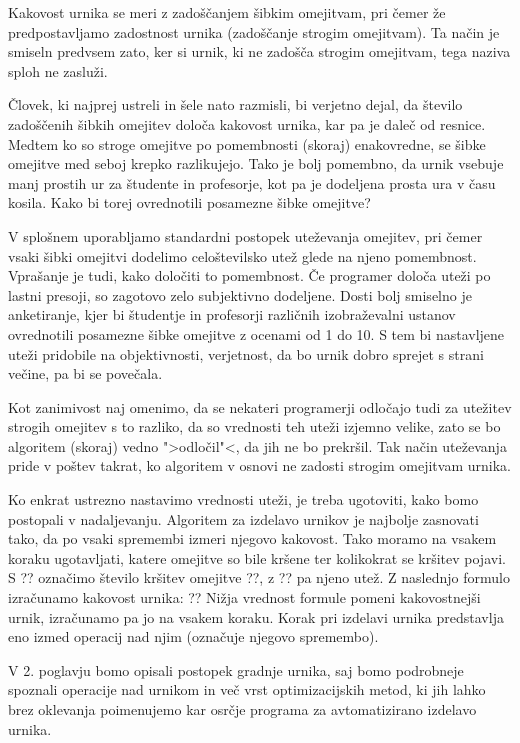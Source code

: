 \documentclass[a4paper,10pt]{article}
\begin{document}
Kakovost urnika se meri z zadoščanjem šibkim omejitvam, pri čemer že predpostavljamo
zadostnost urnika (zadoščanje strogim omejitvam). Ta način je smiseln predvsem zato,
ker si urnik, ki ne zadošča strogim omejitvam, tega naziva sploh ne zasluži.

Človek, ki najprej ustreli in šele nato razmisli, bi verjetno dejal, da število
zadoščenih šibkih omejitev določa kakovost urnika, kar pa je daleč od resnice. Medtem
ko so stroge omejitve po pomembnosti (skoraj) enakovredne, se šibke omejitve med seboj
krepko razlikujejo. Tako je bolj pomembno, da urnik vsebuje manj prostih ur za
študente in profesorje, kot pa je dodeljena prosta ura v času kosila. Kako bi torej
ovrednotili posamezne šibke omejitve?

V splošnem uporabljamo standardni postopek uteževanja omejitev, pri čemer vsaki šibki
omejitvi dodelimo celoštevilsko utež glede na njeno pomembnost. Vprašanje je tudi, kako
določiti to pomembnost. Če programer določa uteži po lastni presoji, so zagotovo zelo
subjektivno dodeljene. Dosti bolj smiselno je anketiranje, kjer bi študentje in profesorji
različnih izobraževalni ustanov ovrednotili posamezne šibke omejitve z ocenami od 1 do 10.
S tem bi nastavljene uteži pridobile na objektivnosti, verjetnost, da bo urnik dobro
sprejet s strani večine, pa bi se povečala.

Kot zanimivost naj omenimo, da se nekateri programerji odločajo tudi za utežitev strogih
omejitev s to razliko, da so vrednosti teh uteži izjemno velike, zato se bo algoritem
(skoraj) vedno ">odločil"<, da jih ne bo prekršil. Tak način uteževanja pride v poštev
takrat, ko algoritem v osnovi ne zadosti strogim omejitvam urnika.

Ko enkrat ustrezno nastavimo vrednosti uteži, je treba ugotoviti, kako bomo postopali
v nadaljevanju. Algoritem za izdelavo urnikov je najbolje zasnovati tako, da po vsaki
spremembi izmeri njegovo kakovost. Tako moramo na vsakem koraku ugotavljati, katere
omejitve so bile kršene ter kolikokrat se kršitev pojavi. S ?? označimo število
kršitev omejitve ??, z ?? pa njeno utež. Z naslednjo formulo izračunamo
kakovost urnika:
??
Nižja vrednost formule pomeni kakovostnejši urnik, izračunamo pa jo na vsakem koraku.
Korak pri izdelavi urnika predstavlja eno izmed operacij nad njim (označuje njegovo
spremembo).

V 2. poglavju bomo opisali postopek gradnje urnika, saj bomo podrobneje spoznali
operacije nad urnikom in več vrst optimizacijskih metod, ki jih lahko brez oklevanja
poimenujemo kar osrčje programa za avtomatizirano izdelavo urnika.
\end{document}
